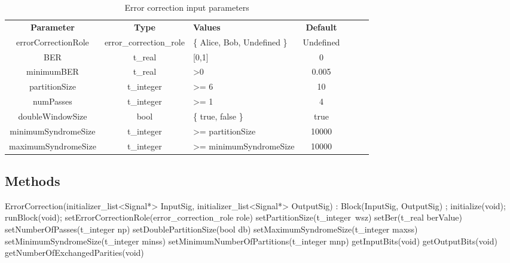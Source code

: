 \begin{table}[h]
	\centering
	\begin{tabular}{|c|c|p{60mm}|c|ccp{60mm}}
		\cline{1-4}
		\textbf{Parameter} & \textbf{Type} & \textbf{Values} &   \textbf{Default} \\ \cline{1-4}
		errorCorrectionRole & error\_correction\_role & \{ Alice, Bob, Undefined
		\} & Undefined \\ \cline{1-4}
		BER &  t\_real & [0,1] & 0 \\\cline{1-4}
		minimumBER & t\_real & >0 & 0.005 \\\cline{1-4}
		partitionSize & t\_integer & >= 6 & 10 \\\cline{1-4}
		numPasses & t\_integer & >= 1 & 4 \\\cline{1-4}
		doubleWindowSize & bool & \{ true, false \} & true \\\cline{1-4}
		minimumSyndromeSize & t\_integer & >= partitionSize & 10000 \\\cline{1-4}
		maximumSyndromeSize & t\_integer & >= minimumSyndromeSize & 10000 \\\cline{1-4}
	\end{tabular}
	\caption{Error correction input parameters}
	\label{table:error_corr_in_par}
\end{table}

\subsection*{Methods}
ErrorCorrection(initializer\_list<Signal*> InputSig, initializer\_list<Signal*> OutputSig) : Block(InputSig, OutputSig) {};
\bigbreak
initialize(void);
\bigbreak
runBlock(void);
\bigbreak
setErrorCorrectionRole(error\_correction\_role role)
\bigbreak
setPartitionSize(t\_integer\ wsz)
\bigbreak
setBer(t\_real berValue)
\bigbreak
setNumberOfPasses(t\_integer np)
\bigbreak
setDoublePartitionSize(bool db)
\bigbreak
setMaximumSyndromeSize(t\_integer maxss)
\bigbreak
setMinimumSyndromeSize(t\_integer minss)
\bigbreak
setMinimumNumberOfPartitions(t\_integer mnp)
\bigbreak
getInputBits(void)
\bigbreak
getOutputBits(void)
\bigbreak
getNumberOfExchangedParities(void)


